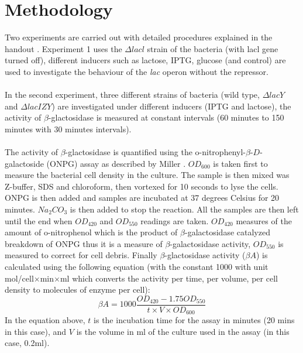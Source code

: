 \documentclass{article}
\begin{document}
\section{Methodology}
Two experiments are carried out with detailed procedures explained in the handout \cite{goossens93}. Experiment 1 uses the $\Delta lacl$ strain of the bacteria (with lacl gene turned off), different inducers such as lactose, IPTG, glucose (and control) are used to investigate the behaviour of the \textit{lac} operon without the repressor. \\ \\
In the second experiment, three different strains of bacteria (wild type, $\Delta lacY$ and $\Delta lacIZY$) are investigated under different inducers (IPTG and lactose), the activity of $\beta$-glactosidase is measured at constant intervals (60 minutes to 150 minutes with 30 minutes intervals). \\ \\
The activity of $\beta$-glactosidase is quantified using the o-nitrophenyl-$\beta$-$D$-galactoside (ONPG) assay as described by Miller \cite{miller}. $OD_{600}$ is taken first to measure the bacterial cell density in the culture. The sample is then mixed was Z-buffer, SDS and chloroform, then vortexed for 10 seconds to lyse the cells. ONPG is then added and samples are incubated at 37 degrees Celsius for 20 minutes. $Na_2CO_3$ is then added to stop the reaction. All the samples are then left until the end when $OD_{420}$ and $OD_{550}$ readings are taken. $OD_{420}$ measures of the amount of o-nitrophenol which is the product of $\beta$-galactosidase catalyzed breakdown of ONPG thus it is a measure of $\beta$-galactosidase activity, $OD_{550}$ is measured to correct for cell debris. Finally $\beta$-glactosidase activity ($\beta A$) is calculated using the following equation (with the constant 1000 with unit mol/cell$\times$min$\times$ml which converts the activity per time, per volume, per cell density to molecules of enzyme per cell):
$$
\beta A = 1000 \dfrac{OD_{420}-1.75OD_{550}}{t\times V\times OD_{600}}
$$
In the equation above, $t$ is the incubation time for the assay in minutes (20 mins in this case), and $V$ is the volume in ml of the culture used in the assay (in this case, 0.2ml).
\end{document}
